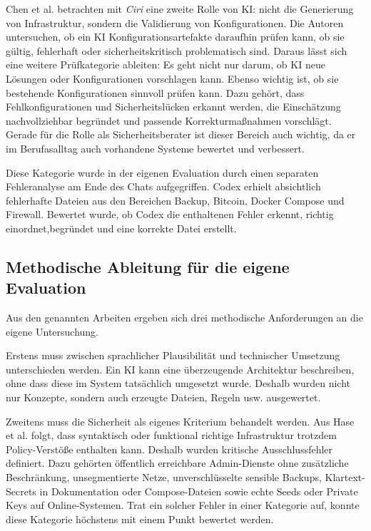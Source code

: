 Chen et al. betrachten mit \emph{Ciri} eine zweite Rolle von \acs{KI}: nicht die Generierung von Infrastruktur, sondern die Validierung von Konfigurationen. Die Autoren untersuchen, ob ein \acs{KI} Konfigurationsartefakte daraufhin prüfen kann, ob sie gültig, fehlerhaft oder sicherheitskritisch problematisch sind. \cite{lian2023ciri} Daraus lässt sich eine weitere Prüfkategorie ableiten: Es geht nicht nur darum, ob \acs{KI} neue Lösungen oder Konfigurationen vorschlagen kann. Ebenso wichtig ist, ob sie bestehende Konfigurationen sinnvoll prüfen kann. Dazu gehört, dass Fehlkonfigurationen und Sicherheitslücken erkannt werden, die Einschätzung nachvollziehbar begründet und passende Korrekturmaßnahmen vorschlägt. Gerade für die Rolle als Sicherheitsberater ist dieser Bereich auch wichtig, da er im Berufasalltag auch vorhandene Systeme bewertet und verbessert.

Diese Kategorie wurde in der eigenen Evaluation durch einen separaten Fehleranalyse am Ende des Chats aufgegriffen. Codex erhielt absichtlich fehlerhafte Dateien aus den Bereichen Backup, Bitcoin, Docker Compose und Firewall. Bewertet wurde, ob Codex die enthaltenen Fehler erkennt, richtig einordnet,begründet und eine korrekte Datei erstellt. 


\subsection{Methodische Ableitung für die eigene Evaluation}

Aus den genannten Arbeiten ergeben sich drei methodische Anforderungen an die eigene Untersuchung.

Erstens muss zwischen sprachlicher Plausibilität und technischer Umsetzung unterschieden werden. Ein \acs{KI} kann eine überzeugende Architektur beschreiben, ohne dass diese im System tatsächlich umgesetzt wurde. Deshalb wurden nicht nur Konzepte, sondern auch erzeugte Dateien, Regeln usw. ausgewertet.

Zweitens muss die Sicherheit als eigenes Kriterium behandelt werden. Aus Hase et al. folgt, dass syntaktisch oder funktional richtige Infrastruktur trotzdem Policy-Verstöße enthalten kann.\cite{hase2026securitypolicyiac} Deshalb wurden kritische Ausschlussfehler definiert. Dazu gehörten öffentlich erreichbare Admin-Dienste ohne zusätzliche Beschränkung, unsegmentierte Netze, unverschlüsselte sensible Backups, Klartext-Secrets in Dokumentation oder Compose-Dateien sowie echte Seeds oder Private Keys auf Online-Systemen. Trat ein solcher Fehler in einer Kategorie auf, konnte diese Kategorie höchstens mit einem Punkt bewertet werden.


